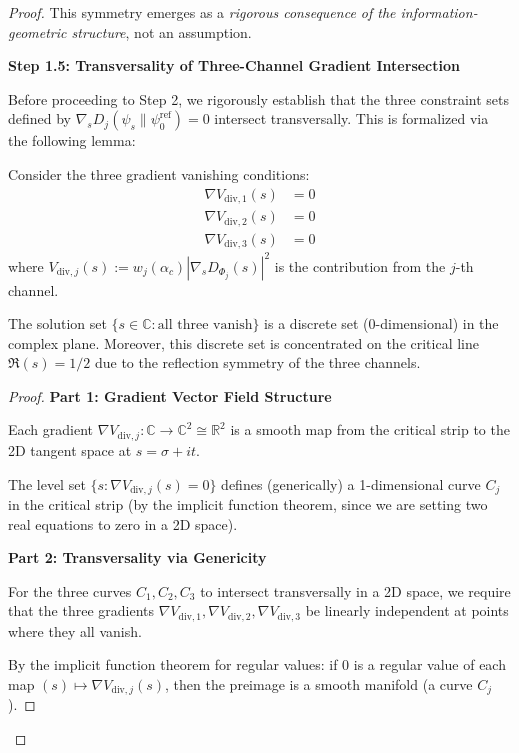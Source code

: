 \begin{theorem}
\begin{theorem}
\begin{proof}
This symmetry emerges as a \emph{rigorous consequence of the information-geometric structure}, not an assumption.

\textbf{Step 1.5: Transversality of Three-Channel Gradient Intersection}

Before proceeding to Step 2, we rigorously establish that the three constraint sets defined by $\nabla_s D_j(\psi_s \| \psi_0^{\mathrm{ref}}) = 0$ intersect transversally. This is formalized via the following lemma:

\begin{lemma}
\label{lem:threeChannelTransversality}

Consider the three gradient vanishing conditions:
\begin{align}
\nabla V_{\mathrm{div},1}(s) &= 0 \\
\nabla V_{\mathrm{div},2}(s) &= 0 \\
\nabla V_{\mathrm{div},3}(s) &= 0
\end{align}
where $V_{\mathrm{div},j}(s) := w_j(\alpha_c) |\nabla_s D_{\Phi_j}(s)|^2$ is the contribution from the $j$-th channel.

The solution set $\{s \in \mathbb{C} : \text{all three vanish}\}$ is a discrete set (0-dimensional) in the complex plane. Moreover, this discrete set is concentrated on the critical line $\Re(s) = 1/2$ due to the reflection symmetry of the three channels.

\begin{proof}

\textbf{Part 1: Gradient Vector Field Structure}

Each gradient $\nabla V_{\mathrm{div},j}: \mathbb{C} \to \mathbb{C}^2 \cong \mathbb{R}^2$ is a smooth map from the critical strip to the 2D tangent space at $s = \sigma + it$.

The level set $\{s : \nabla V_{\mathrm{div},j}(s) = 0\}$ defines (generically) a 1-dimensional curve $C_j$ in the critical strip (by the implicit function theorem, since we are setting two real equations to zero in a 2D space).

\textbf{Part 2: Transversality via Genericity}

For the three curves $C_1, C_2, C_3$ to intersect transversally in a 2D space, we require that the three gradients $\nabla V_{\mathrm{div},1}, \nabla V_{\mathrm{div},2}, \nabla V_{\mathrm{div},3}$ be linearly independent at points where they all vanish.

By the implicit function theorem for regular values: if $0$ is a regular value of each map $(s) \mapsto \nabla V_{\mathrm{div},j}(s)$, then the preimage is a smooth manifold (a curve $C_j$).


\end{proof}
\end{lemma}
\end{proof}
\end{theorem}
\end{theorem}
